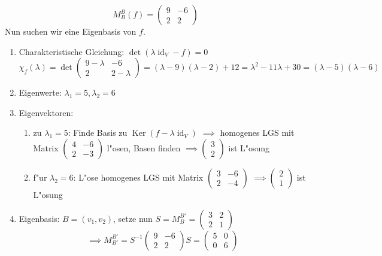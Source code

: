 \documentclass[oneside,fontsize=11pt,paper=a4,BCOR=0mm,DIV=12,automark,headsepline]{scrbook}
\DeclareMathOperator{\mKer}{Ker}
\DeclareMathOperator{\mId}{id}
\theoremstyle{remark}
\theoremstyle{definition}
\theoremstyle{definition}
\theoremstyle{remark}
\begin{document}
\begin{exa}[Eigenwertberechnung]
  \[M^B_B(f) =
    \begin{pmatrix}
      9 & -6 \\
      2 & 2
    \end{pmatrix}\]
  Nun suchen wir eine Eigenbasis von \(f\).
  \begin{enumerate}
  \item Charakteristische Gleichung: \(\det(\lambda\mId_V-f)=0\)
    \[\chi_f(\lambda) = \det\begin{pmatrix}9-\lambda & -6 \\ 2 & 2-\lambda\end{pmatrix} = (\lambda - 9)(\lambda - 2) + 12 = \lambda^2 - 11\lambda + 30 = (\lambda-5)(\lambda-6)\]
  \item Eigenwerte: \(\lambda_1 = 5, \lambda_2 = 6\)
  \item Eigenvektoren:
    \begin{enumerate}
    \item zu \(\lambda_1 = 5\): Finde Basis zu \(\mKer(f - \lambda\mId_V)\) \(\implies\) homogenes LGS mit Matrix \(
        \begin{pmatrix}
          4 & -6 \\
          2 & -3
        \end{pmatrix}
      \) l"osen, Basen finden \(\implies\begin{pmatrix}3\\2\end{pmatrix}\) ist L"osung
    \item f"ur \(\lambda_2 = 6\): L"ose homogenes LGS mit Matrix \(
        \begin{pmatrix}
          3 & -6 \\
          2 & -4
        \end{pmatrix}
\) \(\implies\begin{pmatrix}2\\1\end{pmatrix}\) ist L"osung
\end{enumerate}
\item Eigenbasis: \(B = (v_1, v_2)\), setze nun \(S = M^{B'}_B=\begin{pmatrix}3 & 2\\ 2 & 1\end{pmatrix}\)
  \[\implies M^{B'}_{B'}=S^{-1}\begin{pmatrix}9 & -6 \\ 2 & 2 \end{pmatrix}S = \begin{pmatrix}5 & 0 \\ 0 & 6 \end{pmatrix}\]
  \end{enumerate}
\end{exa}
\end{document}

